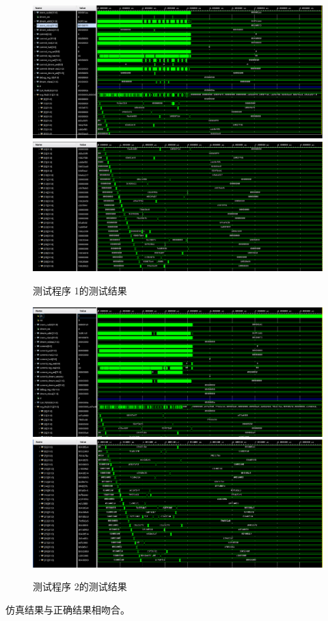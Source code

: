 \documentclass[12pt,a4paper]{ctexart}
\begin{document}
\begin{figure}[H]
    \centering
    \includegraphics[scale=0.4]{pic/test1_1.png}
    \includegraphics[scale=0.4]{pic/test1_2.png}
    \caption{测试程序 1的测试结果}
\end{figure}
\begin{figure}[H]
    \centering
    \includegraphics[scale=0.4]{pic/test2_1.png}
    \includegraphics[scale=0.4]{pic/test2_2.png}
    \caption{测试程序 2的测试结果}
\end{figure}
仿真结果与正确结果相吻合。
\end{document}
